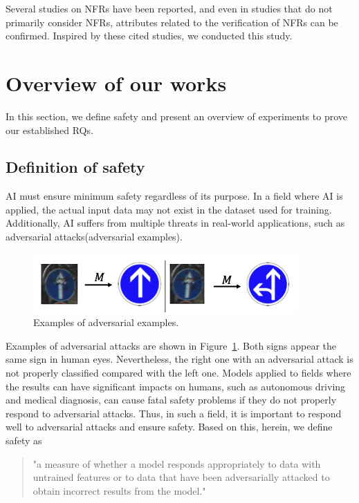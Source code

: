 \documentclass[journal,article,submit,moreauthors,pdftex]{Definitions/mdpi}
\begin{document}
Several studies on NFRs have been reported, and even in studies that do not primarily consider NFRs, attributes related to the verification of NFRs can be confirmed.
Inspired by these cited studies, we conducted this study.

\section{Overview of our works}

In this section, we define safety and present an overview of experiments to prove our established RQs.

\subsection{Definition of safety}

AI must ensure minimum safety regardless of its purpose. In a field where AI is applied, the actual input data may not exist in the dataset used for training.
Additionally, AI suffers from multiple threats in real-world applications, such as adversarial attacks(adversarial examples).

\begin{figure}[H]
\includegraphics[width=13 cm]{Definitions/example-of-adversarial.png}
\caption{Examples of adversarial examples.\label{example-of-adversarial}}
\end{figure}   

Examples of adversarial attacks are shown in Figure~\ref{example-of-adversarial}. Both signs appear the same sign in human eyes. Nevertheless, the right one with an adversarial attack is not properly classified compared with the left one.
Models applied to fields where the results can have significant impacts on humans, such as autonomous driving and medical diagnosis, can cause fatal safety problems if they do not properly respond to adversarial attacks. Thus, in such a field, it is important to respond well to adversarial attacks and ensure safety.
Based on this, herein, we define safety as

\begin{quote}
    "a measure of whether a model responds appropriately to data with untrained features or to data that have been adversarially attacked to obtain incorrect results from the model."
\end{quote}
\end{document}
